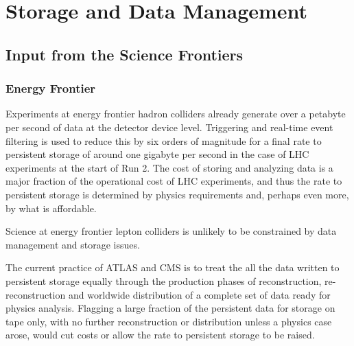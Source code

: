  
\chapter{Storage and Data Management}
\label{chap:mag}


\begin{center}\begin{boldmath}



\end{boldmath}\end{center}


\section{Input from the Science Frontiers}
\label{sec:cpfi5-input}
\subsection{Energy Frontier}
Experiments at energy frontier hadron colliders already generate over a petabyte per 
second of data at the detector device level.  Triggering and real-time event filtering 
is used to reduce this by six orders of magnitude for a final rate to persistent storage 
of around one gigabyte per second in the case of LHC experiments at the start of Run 2.  
The cost of storing and analyzing data is a major fraction of the operational cost of LHC experiments, and thus the rate to persistent storage is determined by physics requirements and, perhaps even more, by what is affordable.

Science at energy frontier lepton colliders is unlikely to be constrained by data 
management and storage issues.

The current practice of ATLAS and CMS is to treat the all the data written to persistent 
storage equally through the production phases of reconstruction, re-reconstruction and 
worldwide distribution of a complete set of data ready for physics analysis.  Flagging 
a large fraction of the persistent data for storage on tape only, with no further 
reconstruction or distribution unless a physics case arose, would cut costs or allow 
the rate to persistent storage to be raised.

